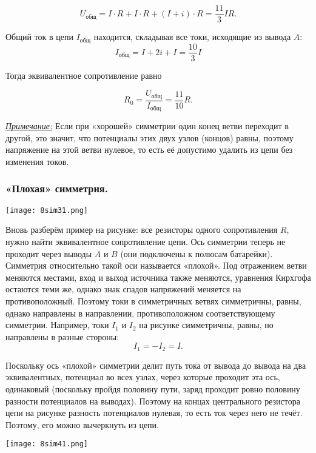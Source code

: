 \documentclass[12pt, a4paper]{article}%
\begin{document}
\[
U_\text{общ} = I\cdot R + I\cdot R + (I+i)\cdot R = \frac{11}{3}IR.
\]

Общий ток в цепи $I_\text{общ}$ находится, складывая все токи, исходящие из вывода $A$:
\[
I_\text{общ} = I+2i+I = \frac{10}{3}I
\]

Тогда эквивалентное сопротивление равно

\[
R_0 = \frac{U_\text{общ}}{I_\text{общ}} = \frac{11}{10}R.
\]

\textit{\underline{Примечание:}} Если при «хорошей» симметрии один конец ветви переходит в другой, это значит, что потенциалы этих двух узлов (концов) равны, поэтому напряжение на этой ветви нулевое, то есть её допустимо удалить из цепи без изменения токов.


\subsubsection*{«Плохая» симметрия.}

\begin{center}
\texttt{[image: 8sim31.png]}
\label{fig:mpr}
\end{center}


Вновь разберём пример на рисунке: все резисторы одного сопротивления $R$, нужно найти 
эквивалентное сопротивление цепи. Ось симметрии теперь не проходит через выводы $A$ и $B$ (они подключены к полюсам батарейки). 
Симметрия относительно такой оси называется «плохой».
Под отражением ветви меняются местами, вход и выход источника также меняются, уравнения Кирхгофа остаются теми же, однако знак спадов напряжений меняется на противоположный.
Поэтому токи в симметричных ветвях симметричны, равны, однако направлены в направлении, противоположном соответствующему симметрии. Например, токи $I_1$ и $I_2$ на рисунке симметричны, равны, но направлены в разные стороны:
\[
I_1 = -I_2 = I.
\]

Поскольку ось «плохой» симметрии делит путь тока от вывода до вывода на два эквивалентных, потенциал во всех узлах, через которые
проходит эта ось, одинаковый (поскольку пройдя половину пути, заряд проходит ровно половину разности потенциалов на выводах). 
Поэтому на концах центрального резистора
цепи на рисунке разность потенциалов нулевая, то есть ток через него не течёт. Поэтому, его можно вычеркнуть из цепи.

\begin{center}
\texttt{[image: 8sim41.png]}
\label{fig:mpr}
\end{center}
\end{document}
